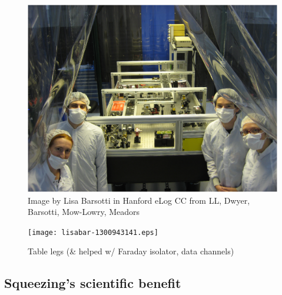 \begin{figure}
\includegraphics[width=0.6\paperwidth]{lisabar-1289966130.eps}




\caption{Image by Lisa Barsotti in Hanford eLog
\newline CC from LL, Dwyer, Barsotti, Mow-Lowry, Meadors
}
\end{figure}
\begin{figure}
\texttt{[image: lisabar-1300943141.eps]}
\caption{Table legs (\& helped w/ Faraday isolator, data channels)
}
\end{figure}



\subsection{Squeezing's scientific benefit}


